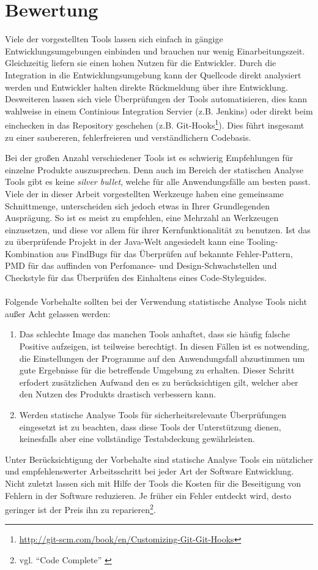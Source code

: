 \section{Bewertung}
Viele der vorgestellten Tools lassen sich einfach in gängige Entwicklungsumgebungen einbinden und brauchen nur wenig Einarbeitungszeit. Gleichzeitig liefern sie einen hohen Nutzen für die Entwickler. 
Durch die Integration in die Entwicklungsumgebung kann der Quellcode direkt analysiert werden und Entwickler halten direkte Rückmeldung über ihre Entwicklung. Desweiteren lassen sich viele Überprüfungen der Tools automatisieren, dies kann wahlweise in einem Continious Integration Servier (z.B. Jenkins) oder direkt beim einchecken in das Repository geschehen (z.B. Git-Hooks\footnote{\url{http://git-scm.com/book/en/Customizing-Git-Git-Hooks}}). Dies führt insgesamt zu einer saubereren, fehlerfreieren und verständlichern Codebasis.

Bei der großen Anzahl verschiedener Tools ist es schwierig Empfehlungen für einzelne Produkte auszusprechen. Denn auch im Bereich der statischen Analyse Tools gibt es keine \emph{silver bullet}, welche für alle Anwendungsfälle am besten passt. Viele der in dieser Arbeit vorgestellten Werkzeuge haben eine gemeinsame Schnittmenge, unterscheiden sich jedoch etwas in Ihrer Grundlegenden Ausprägung. So ist es meist zu empfehlen, eine Mehrzahl an Werkzeugen einzusetzen, und diese vor allem für ihrer Kernfunktionalität zu benutzen.
Ist das zu überprüfende Projekt in der Java-Welt angesiedelt kann eine Tooling-Kombination aus FindBugs für das Überprüfen auf bekannte Fehler-Pattern, PMD für das auffinden von Perfomance- und Design-Schwachstellen und Checkstyle für das Überprüfen des Einhaltens eines Code-Styleguides.\\\\

Folgende Vorbehalte sollten bei der Verwendung statistische Analyse Tools nicht außer Acht gelassen werden:
\begin{enumerate}
  \item Das schlechte Image das manchen Tools anhaftet, dass sie häufig falsche Positive aufzeigen, ist teilweise berechtigt. In diesen Fällen ist es notwending, die Einstellungen der Programme auf den Anwendungsfall abzustimmen um gute Ergebnisse für die betreffende Umgebung zu erhalten. Dieser Schritt erfodert zusätzlichen Aufwand den es zu berücksichtigen gilt, welcher aber den Nutzen des Produkts drastisch verbessern kann.
  \item Werden statische Analyse Tools für sicherheitsrelevante Überprüfungen eingesetzt ist zu beachten, dass diese Tools der Unterstützung dienen, keinesfalls aber eine vollständige Testabdeckung gewährleisten.
\end{enumerate}

Unter Berücksichtigung der Vorbehalte sind statische Analyse Tools ein nützlicher und empfehlenswerter Arbeitsschritt bei jeder  Art der Software Entwicklung. Nicht zuletzt lassen sich mit Hilfe der Tools die Kosten für die Beseitigung von Fehlern in der Software reduzieren. Je früher ein Fehler entdeckt wird, desto geringer ist der Preis ihn zu reparieren\footnote{vgl. ``Code Complete'' \citep{mcconnell2004}}.
